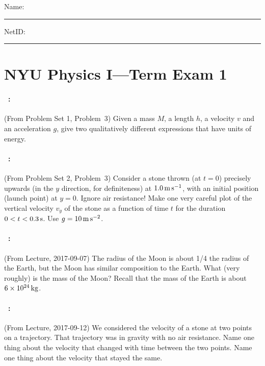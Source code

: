 \documentclass[12pt]{article}
\begin{document}
\noindent
Name: \rule[-1ex]{0.55\textwidth}{0.1pt}
NetID: \rule[-1ex]{0.2\textwidth}{0.1pt}

\section*{NYU Physics I---Term Exam 1}

\paragraph{\problemname~\theproblem:}%
(From Problem Set 1, Problem~3)
Given a mass $M$, a length $h$, a velocity $v$ and an acceleration
$g$, give two qualitatively different expressions that have units of
energy.

\vfill

\paragraph{\problemname~\theproblem:}%
(From Problem Set 2, Problem~3)
Consider a stone thrown (at $t=0$) precisely upwards (in the $y$
direction, for definiteness) at $1.0\,\mathrm{m}\,\mathrm{s}^{-1}$, with an initial
position (launch point) at $y=0$.  Ignore air resistance! Make one
very careful plot of the vertical velocity $v_y$ of the stone as a
function of time $t$ for the duration $0<t<0.3\,\mathrm{s}$. Use
$g=10\,\mathrm{m}\,\mathrm{s}^{-2}$.

\vfill

\paragraph{\problemname~\theproblem:}%
(From Lecture, 2017-09-07)
The radius of the Moon is about 1/4 the radius of the Earth, but
the Moon has similar composition to the Earth. What (very roughly)
is the mass of the Moon? Recall that the mass of the Earth is
about $6\times 10^{24}\,\mathrm{kg}$.

\vfill

\clearpage
\paragraph{\problemname~\theproblem:}%
(From Lecture, 2017-09-12)
We considered the velocity of a stone at two points on a trajectory.
That trajectory was in gravity with no air resistance.
Name one thing about the velocity that changed with time between
the two points.
Name one thing about the velocity that stayed the same.
\end{document}
